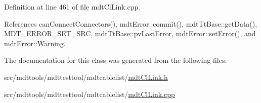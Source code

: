 Definition at line 461 of file mdt\-Cl\-Link.\-cpp.



References can\-Connect\-Connectors(), mdt\-Error\-::commit(), mdt\-Tt\-Base\-::get\-Data(), M\-D\-T\-\_\-\-E\-R\-R\-O\-R\-\_\-\-S\-E\-T\-\_\-\-S\-R\-C, mdt\-Tt\-Base\-::pv\-Last\-Error, mdt\-Error\-::set\-Error(), and mdt\-Error\-::\-Warning.



The documentation for this class was generated from the following files\-:\begin{DoxyCompactItemize}
\item 
src/mdttools/mdttesttool/mdtcablelist/\hyperlink{mdt_cl_link_8h}{mdt\-Cl\-Link.\-h}\item 
src/mdttools/mdttesttool/mdtcablelist/\hyperlink{mdt_cl_link_8cpp}{mdt\-Cl\-Link.\-cpp}\end{DoxyCompactItemize}
